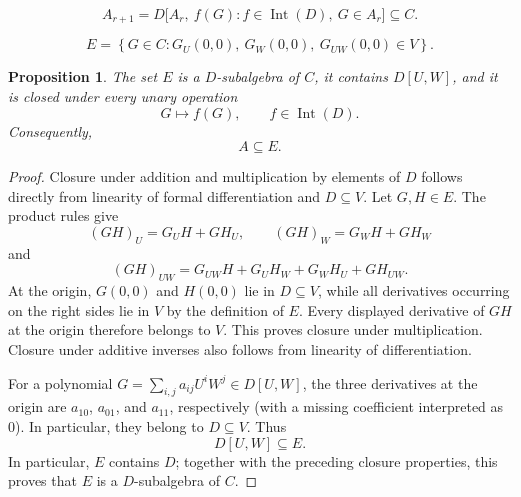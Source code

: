 \documentclass[10pt,a4paper]{amsart}
\newtheorem{proposition}{Proposition}
\newcommand{\Int}{\operatorname{Int}}
\begin{document}
\begin{equation}
 A_{r+1}
  =D\big[A_r,\ f(G):f\in\Int(D),\ G\in A_r\big]\subseteq C.
 \label{eq:Ar}
\end{equation}

\begin{equation}
 E=\left\{
 G\in C:
 G_U(0,0),\ G_W(0,0),\ G_{UW}(0,0)\in V
 \right\}.
 \label{eq:E}
\end{equation}

\begin{proposition}\label{prop:invariant}
The set \(E\) is a \(D\)-subalgebra of \(C\), it contains
\(D[U,W]\), and it is closed under every unary operation
\[
 G\longmapsto f(G),\qquad f\in\Int(D).
\]
Consequently,
\[
 A\subseteq E.
\]
\end{proposition}

\begin{proof}
Closure under addition and multiplication by elements of \(D\) follows
directly from linearity of formal differentiation and \(D\subseteq V\).
Let \(G,H\in E\).  The product rules give
\[
 (GH)_U=G_UH+GH_U,\qquad
 (GH)_W=G_WH+GH_W
\]
and
\begin{equation}
 (GH)_{UW}
  =G_{UW}H+G_UH_W+G_WH_U+GH_{UW}.
 \label{eq:product-mixed}
\end{equation}
At the origin, \(G(0,0)\) and \(H(0,0)\) lie in \(D\subseteq V\),
while all derivatives occurring on the right sides lie in \(V\) by
the definition of \(E\).  Every displayed derivative of \(GH\) at the
origin therefore belongs to \(V\).  This proves closure under
multiplication.  Closure under additive inverses also follows from
linearity of differentiation.

For a polynomial
\(G=\sum_{i,j}a_{ij}U^iW^j\in D[U,W]\), the three derivatives at the
origin are \(a_{10}\), \(a_{01}\), and \(a_{11}\), respectively (with
a missing coefficient interpreted as \(0\)).  In particular, they
belong to \(D\subseteq V\).
Thus
\[
 D[U,W]\subseteq E.
\]
In particular, \(E\) contains \(D\); together with the preceding
closure properties, this proves that \(E\) is a \(D\)-subalgebra of
\(C\).


\end{proof}
\end{document}
